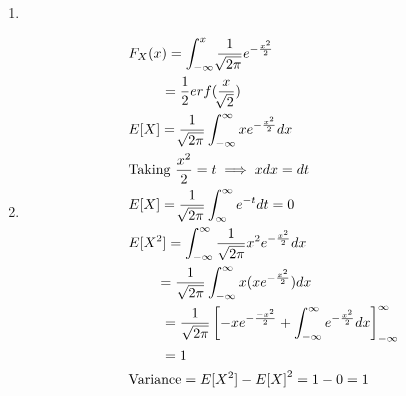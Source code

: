 \documentclass[journal,12pt,twocolumn]{IEEEtran}
\renewcommand\thesection{\arabic{section}}
\begin{document}
\begin{enumerate}[label=\thesection.\arabic*
,ref=\thesection.\theenumi]
\begin{figure}[h]
    \caption{The PDF of $X$}\label{fig:gauss_pdf}
    \end{figure}
    \item
    \item \begin{align}
        &F_X(x) = \int_{-\infty}^{x} \frac{1}{\sqrt[]{2\pi}}e^{-\frac{x^2}{2}}\\
        &~~~~~~~= \frac{1}{2} erf(\frac{x}{\sqrt[]{2}})\\
        &E[X] = \frac{1}{\sqrt[]{2\pi}}\int_{-\infty}^{\infty}xe^{-\frac{x^2}{2}}dx\\
        &\text{Taking  }\frac{x^2}{2} = t \implies x dx = dt\\
        &E[X] = \frac{1}{\sqrt[]{2\pi}}\int_{\infty}^{\infty}e^{-t}dt = 0\\
        &E[X^2]=\int_{-\infty}^{\infty} \frac{1}{\sqrt{2\pi}} x^2e^{-\frac{x^2}{2}} dx\\
        &~~~~~~=\frac{1}{\sqrt{2\pi}}\int_{-\infty}^{\infty}  x(xe^{-\frac{x^2}{2}}) dx\\
        &~~~~~~~= \frac{1}{\sqrt{2\pi}} {}\left[-xe^{-\frac{-x^2}{2}}+\int_{-\infty}^{\infty} e^{-\frac{x^2}{2}} dx\right]^{\infty}_{-\infty}\\
        &~~~~~~~= 1\\
        &\text{Variance} = E[X^2] - {E[X]}^2 = 1 - 0 = 1
    \end{align}
    \end{enumerate}
\end{document}
